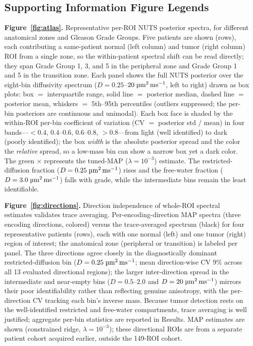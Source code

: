 \subsection*{Supporting Information Figure Legends}

\noindent\textbf{Figure~\ref{fig:atlas}.}
Representative per-ROI NUTS posterior spectra, for different anatomical zones and Gleason Grade Groups. Five patients are shown (rows), each
contributing a same-patient normal (left column) and tumor (right column) ROI
from a single zone, so the within-patient spectral shift can be read directly;
they span Grade Group 1, 3, and 5 in the peripheral zone and Grade Group 1 and 5
in the transition zone. Each panel shows the full NUTS posterior over the eight-bin
diffusivity
spectrum ($D = 0.25$--$20\;\si{\micro\meter\squared\per\milli\second}$, left to right) drawn as box plots: box $=$
interquartile range, solid line $=$ posterior median, dashed line $=$ posterior
mean, whiskers $=$ 5th--95th percentiles (outliers suppressed; the per-bin
posteriors are continuous and unimodal). Each box face is shaded by the
within-ROI per-bin coefficient of variation (CV $=$ posterior std $/$ mean) in four bands---$< 0.4$, $0.4$--$0.6$, $0.6$--$0.8$, $> 0.8$---from light (well identified) to
dark (poorly identified); the box
\emph{width} is the absolute posterior spread and the color the \emph{relative}
spread, so a low-mass bin can show a narrow box yet a dark color. The
green $\times$ represents the tuned-MAP ($\lambda = 10^{-3}$) estimate. The
restricted-diffusion fraction ($D = 0.25\;\si{\micro\meter\squared\per\milli\second}$) rises and the free-water
fraction ($D = 3.0\;\si{\micro\meter\squared\per\milli\second}$) falls with grade, while the intermediate bins
remain the least identifiable.

\medskip\noindent\textbf{Figure~\ref{fig:directions}.}
Direction independence of whole-ROI spectral estimates validates trace
averaging.
Per-encoding-direction MAP spectra (three encoding directions, colored) versus
the trace-averaged spectrum (black) for four representative patients (rows),
each with one normal (left) and one tumor (right) region of interest; the
anatomical zone (peripheral or transition) is labeled per panel.
The three directions agree closely in the diagnostically dominant
restricted-diffusion bin ($D = 0.25\;\si{\micro\meter\squared\per\milli\second}$; mean direction-wise CV $9\%$
across all 13 evaluated directional regions); the larger inter-direction spread in the
intermediate and near-empty bins ($D = 0.5$--$2.0$ and $D = 20\;\si{\micro\meter\squared\per\milli\second}$)
mirrors their poor identifiability rather than reflecting genuine anisotropy,
with the per-direction CV tracking each bin's inverse mass.
Because tumor detection rests on the well-identified restricted and free-water compartments, trace
averaging is well justified; aggregate per-bin statistics are reported in
Results.
MAP estimates are shown (constrained ridge, $\lambda = 10^{-3}$); these
directional ROIs are from a separate patient cohort acquired earlier, outside the 149-ROI cohort.

